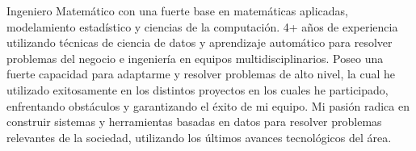 

\begin{cvparagraph}


Ingeniero Matemático con una fuerte base en matemáticas aplicadas, modelamiento estadístico y 
ciencias de la computación. 4+ años de experiencia utilizando técnicas de ciencia de datos y aprendizaje
automático para resolver problemas del negocio e ingeniería en equipos multidisciplinarios. 
Poseo una fuerte capacidad para adaptarme y resolver problemas de alto nivel, la cual he utilizado exitosamente en los
distintos proyectos en los cuales he participado, enfrentando obstáculos y garantizando el éxito de mi equipo.
Mi pasión radica en construir sistemas y herramientas basadas en datos para resolver problemas relevantes de la sociedad,
utilizando los últimos avances tecnológicos del área.


\end{cvparagraph}
